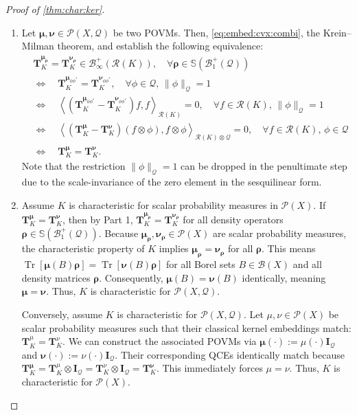 \documentclass[noinfoline]{imsart}\setcounter{tocdepth}{2}
\renewcommand{\b}[1]{\mathbb{#1}} %
\newcommand{\m}[1]{\mathbf{#1}} %
\newcommand{\s}[1]{\mathscr{#1}} %
\renewcommand{\c}[1]{\mathcal{#1}} %
\newcommand{\mb}[1]{\boldsymbol{#1}} %
\newcommand{\tr}[1]{\operatorname{Tr}\left[#1\right]}
\newcommand{\innpr}[2]{{\left\langle {#1},{#2}\right\rangle}} %
\theoremstyle{plain}
\begin{document}
\begin{appendix}
\begin{proof}[Proof of \cref{thm:char:ker}]
\begin{enumerate}[leftmargin = *]
\item Let $\mb{\mu}, \mb{\nu}  \in \s{P}(X, \c{Q})$ be two POVMs. Then, \eqref{eq:embed:cvx:combi}, the Krein--Milman theorem, and \cite[Proposition A.63]{hall2013quantum} establish the following equivalence:
\begin{align*}
    &\m{T}_{K}^{\mb{\mu}_{\mb{\rho}}} = \m{T}_{K}^{\mb{\nu}_{\mb{\rho}}} \in \c{B}_{\infty}^{+}(\c{R}(K)), \quad \forall \mb{\rho} \in \b{S}(\c{B}_{1}^{+}(\c{Q})) \\ 
    &\Leftrightarrow \quad \m{T}_{K}^{\mb{\mu}_{\phi \phi^{*}}} = \m{T}_{K}^{\mb{\nu}_{\phi \phi^{*}}}, \quad \forall \phi \in \c{Q}, \, \|\phi\|_{\c{Q}} = 1 \\
    &\Leftrightarrow \quad \innpr{(\m{T}_{K}^{\mb{\mu}_{\phi \phi^{*}}} - \m{T}_{K}^{\mb{\nu}_{\phi \phi^{*}}}) f}{f}_{\c{R}(K)} = 0, \quad \forall f \in \c{R}(K), \, \|\phi\|_{\c{Q}} = 1 \\
    &\Leftrightarrow \quad \innpr{(\m{T}_{K}^{\mb{\mu}} - \m{T}_{K}^{\mb{\nu}}) (f \otimes \phi)}{f \otimes \phi}_{\c{R}(K) \otimes \c{Q}} = 0, \quad \forall f \in \c{R}(K), \, \phi \in \c{Q} \quad \\ 
    &\Leftrightarrow \quad \m{T}_{K}^{\mb{\mu}} = \m{T}_{K}^{\mb{\nu}}.
\end{align*}
Note that the restriction $\|\phi\|_{\c{Q}} = 1$ can be dropped in the penultimate step due to the scale-invariance of the zero element in the sesquilinear form.
\item Assume $K$ is characteristic for scalar probability measures in $\s{P}(X)$. If $\m{T}_{K}^{\mb{\mu}} = \m{T}_{K}^{\mb{\nu}}$, then by Part 1, $\m{T}_{K}^{\mb{\mu}_{\mb{\rho}}} = \m{T}_{K}^{\mb{\nu}_{\mb{\rho}}}$ for all density operators $\mb{\rho} \in \b{S}(\c{B}_{1}^{+}(\c{Q}))$. Because $\mb{\mu}_{\mb{\rho}}, \mb{\nu}_{\mb{\rho}} \in \s{P}(X)$ are scalar probability measures, the characteristic property of $K$ implies $\mb{\mu}_{\mb{\rho}} = \mb{\nu}_{\mb{\rho}}$ for all $\mb{\rho}$. This means $\tr{\mb{\mu}(B) \mb{\rho}} = \tr{\mb{\nu}(B) \mb{\rho}}$ for all Borel sets $B \in \s{B}(X)$ and all density matrices $\mb{\rho}$. Consequently, $\mb{\mu}(B) = \mb{\nu}(B)$ identically, meaning $\mb{\mu} = \mb{\nu}$. Thus, $K$ is characteristic for $\s{P}(X, \c{Q})$.

Conversely, assume $K$ is characteristic for $\s{P}(X, \c{Q})$. Let $\mu, \nu \in \s{P}(X)$ be scalar probability measures such that their classical kernel embeddings match: $\m{T}_{K}^{\mu} = \m{T}_{K}^{\nu}$. We can construct the associated POVMs via $\mb{\mu}(\cdot) := \mu(\cdot) \m{I}_{\c{Q}}$ and $\mb{\nu}(\cdot) := \nu(\cdot) \m{I}_{\c{Q}}$. Their corresponding QCEs identically match because $\m{T}_{K}^{\mb{\mu}} = \m{T}_{K}^{\mu} \otimes \m{I}_{\c{Q}} = \m{T}_{K}^{\nu} \otimes \m{I}_{\c{Q}} = \m{T}_{K}^{\mb{\nu}}$. This immediately forces $\mu = \nu$. Thus, $K$ is characteristic for $\s{P}(X)$.
\end{enumerate}
\end{proof}



\end{appendix}
\end{document}
